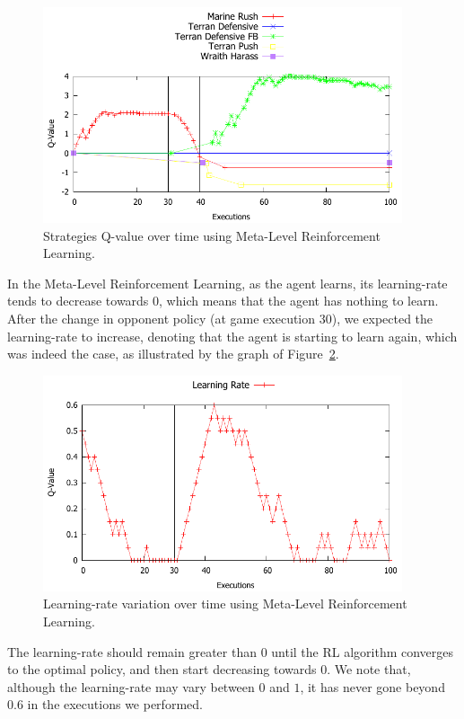 \begin{figure}[ht]
\centering
\includegraphics[width=400px]{images/meta-learning_strategies_graphic}
\caption{Strategies Q-value over time using Meta-Level Reinforcement Learning.}
\label{fig:meta-learning_strategies_graphic}
\end{figure}

In the Meta-Level Reinforcement Learning, as the agent learns, its learning-rate tends to decrease towards $0$, which means that the agent has nothing to learn.
After the change in opponent policy (at game execution $30$), we expected the learning-rate to increase, denoting that the agent is starting to learn again, which was indeed the case, as illustrated by the graph of Figure~\ref{fig:learning-rate_graphic}. 

\begin{figure}[ht]
\centering
\includegraphics[width=400px]{images/learning-rate_graphic}
\caption{Learning-rate variation over time using Meta-Level Reinforcement Learning.}
\label{fig:learning-rate_graphic}
\end{figure}

The learning-rate should remain greater than $0$ until the RL algorithm converges to the optimal policy, and then start decreasing towards $0$.
We note that, although the learning-rate may vary between $0$ and $1$, it has never gone beyond $0.6$ in the executions we performed.

